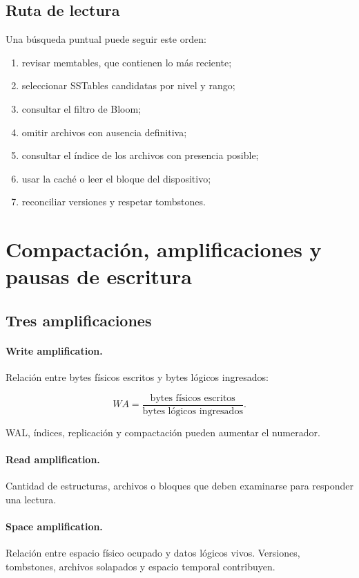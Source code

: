 \documentclass[variant=apuntes,cover=institutional,mode=screen]{ua-engineering-v6-article}
\begin{document}
\subsection{Ruta de lectura}

Una búsqueda puntual puede seguir este orden:

\begin{enumerate}
\item revisar memtables, que contienen lo más reciente;
\item seleccionar SSTables candidatas por nivel y rango;
\item consultar el filtro de Bloom;
\item omitir archivos con ausencia definitiva;
\item consultar el índice de los archivos con presencia posible;
\item usar la caché o leer el bloque del dispositivo;
\item reconciliar versiones y respetar tombstones.
\end{enumerate}

\section{Compactación, amplificaciones y pausas de escritura}

\subsection{Tres amplificaciones}

\paragraph{Write amplification.} Relación entre bytes físicos escritos y bytes lógicos ingresados:

\[
WA = \frac{\text{bytes físicos escritos}}{\text{bytes lógicos ingresados}}.
\]

WAL, índices, replicación y compactación pueden aumentar el numerador.

\paragraph{Read amplification.} Cantidad de estructuras, archivos o bloques que deben examinarse para responder una lectura.

\paragraph{Space amplification.} Relación entre espacio físico ocupado y datos lógicos vivos. Versiones, tombstones, archivos solapados y espacio temporal contribuyen.
\end{document}
